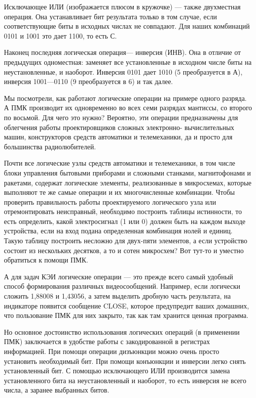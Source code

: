 \documentclass[11pt,a4paper,oneside]{article}
\begin{document}
Исключающее ИЛИ (изображается плюсом в кружочке) — также двухместная операция. Она устанавливает бит результата только в том случае, если соответствующие биты в исходных числах не совпадают. Для наших комбинаций 0101 и 1001 это дает 1100, то есть С.

Наконец последняя логическая операция— инверсия (ИНВ). Она в отличие от предыдущих одноместная: заменяет все установленные в исходном числе биты на неустановленные, и наоборот. Инверсия  0101 дает 1010 (5 преобразуется в А), инверсия 1001—0110 (9 преобразуется в 6) и так далее.

Мы посмотрели, как работают логические операции на примере одного разряда. А ПМК производит их одновременно во всех семи разрядах мантиссы, со второго по восьмой. Для чего это нужно? Вероятно, эти операции предназначены для облегчения работы проектировщиков сложных электронно- вычислительных машин, конструкторов средств автоматики и телемеханики, да и просто для большинства радиолюбителей.

Почти все логические узлы средств автоматики и телемеханики, в том числе блоки управления бытовыми приборами и сложными станками, магнитофонами и ракетами, содержат логические элементы, реализованные в микросхемах, которые выполняют те же самые операции и их многочисленные комбинации. Чтобы проверить правильность работы проектируемого логического узла или отремонтировать неисправный, необходимо построить таблицы истинности, то есть определить, какой электросигнал (1 или 0) должен быть на каждом выходе устройства, если на вход подана определенная комбинация нолей и единиц. Такую таблицу построить несложно для двух-пяти элементов, а если устройство состоит из нескольких десятков, а то и сотен микросхем? Вот тут-то и уместно обратиться к помощи ПМК.

А для задач КЭИ логические операции — это прежде всего самый удобный способ формирования различных видеосообщений. Например, если логически сложить 1,88008 и 1,43056, а затем выделить дробную часть результата, на индикаторе появится сообщение CLOSE, которое предупредит ваших домашних, что пользование ПМК для них закрыто, так как там хранится ценная программа.

Но основное достоинство использования логических операций (в применении ПМК) заключается в удобстве работы с закодированной в регистрах информацией. При помощи операции дизъюнкции можно очень просто установить необходимый бит. При помощи конъюнкции и инверсии легко снять установленный бит. С помощью исключающего ИЛИ производится замена установленного бита на неустановленный и наоборот, то есть инверсия не всего числа, а заранее выбранных битов.
\end{document}
